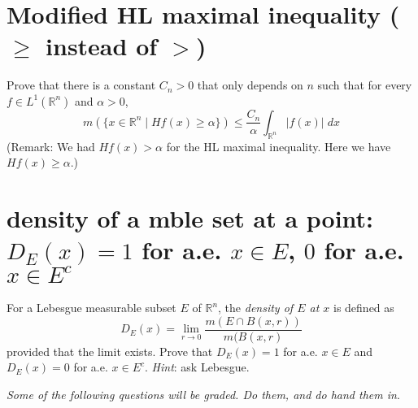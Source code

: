 \documentclass[lang=cn,11pt]{elegantbook}
\begin{document}
\section{Modified HL maximal inequality ($\geq$ instead of $>$)}
Prove that there is a constant $C_n>0$ that only depends on $n$ such that for every $f\in L^1(\mathbb{R}^n)$ and $\alpha>0$,
\[
m(\{x\in \mathbb{R}^n\mid Hf(x)\ge \alpha\}) \le \frac{C_n}{\alpha} \int_{\mathbb{R}^n} |f(x)|\;d x
\]
(Remark: We had $Hf(x)> \alpha$ for the HL maximal inequality. Here we have $Hf(x)\ge \alpha$.) 





\section{density of a mble set at a point: $D_E(x)=1$ for a.e. $x\in E$, $0$ for a.e. $x\in E^c$}
  For a Lebesgue measurable subset $E$ of $\mathbb{R}^n$, the \emph{density of $E$ at $x$} is defined as 
  \[
    D_E(x)= \lim_{r\to 0} \frac{m(E\cap B(x,r))}{m(B(x,r)}
  \]
  provided that the limit exists.
  Prove that $D_E(x)=1$ for a.e. $x\in E$ and $D_E(x)=0$ for a.e. $x\in E^c$. 
  \textit{Hint}: ask Lebesgue.







\newpage
\vspace*{5mm}
\begin{center}
\textit{Some of the following questions will be graded. Do them, and do hand them in}.
\end{center}
\end{document}
